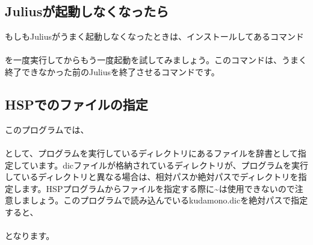 \documentclass[text06.tex]{subfiles}
\begin{document}
\subsection{Juliusが起動しなくなったら}
もしもJuliusがうまく起動しなくなったときは、インストールしてあるコマンド\\
\mbox{}\\
を一度実行してからもう一度起動を試してみましょう。このコマンドは、うまく終了できなかった前のJuliusを終了させるコマンドです。

\subsection{HSPでのファイルの指定}
このプログラムでは、\\
\mbox{}\quad\\
として、プログラムを実行しているディレクトリにある\mbox{}ファイルを辞書として指定しています。dicファイルが格納されているディレクトリが、プログラムを実行しているディレクトリと異なる場合は、相対パスか絶対パスでディレクトリを指定します。HSPプログラムからファイルを指定する際に\textasciitilde は使用できないので注意しましょう。このプログラムで読み込んでいる\mbox{kudamono.dic}を絶対パスで指定すると、\\
\mbox{}\\
となります。
\end{document}
